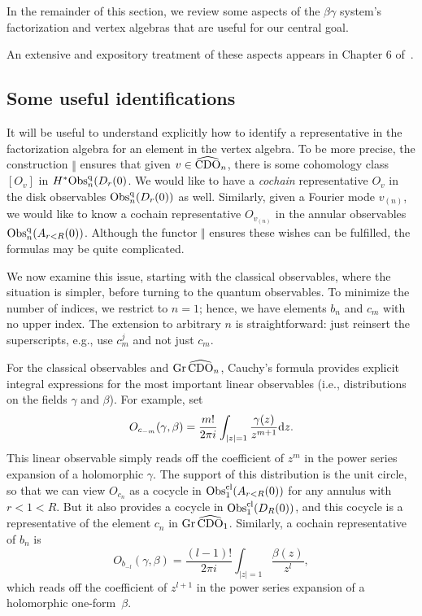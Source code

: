 In the remainder of this section, we review some aspects of the $\beta\gamma$ system's factorization
and vertex algebras that are useful for our central goal.

\begin{rmk}
An extensive and expository treatment of these aspects appears in Chapter 6 of~\cite{GwThesis}.
\end{rmk}

\subsection{Some useful identifications}
\label{identifications}

It will be useful to understand explicitly how to identify a representative in the factorization algebra for an element in the vertex algebra.
To be more precise, the construction $\Vert$ ensures that given $v \in \widehat{\rm CDO}_n$, there is some cohomology class $[O_v]$ in $H^* {\rm Obs}^{\rm q}_n(D_r(0)$.
We would like to have a {\em cochain} representative $O_v$ in the disk observables ${\rm Obs}^{\rm q}_n(D_r(0))$ as well.
Similarly, given a Fourier mode $v_{(n)}$, 
we would like to know a cochain representative $O_{v_{(n)}}$ in the annular observables ${\rm Obs}^{\rm q}_n(A_{r<R}(0))$.
Although the functor $\Vert$ ensures these wishes can be fulfilled,
the formulas may be quite complicated.

We now examine this issue, starting with the classical observables, where the situation is simpler,
before turning to the quantum observables.
To minimize the number of indices, we restrict to $n = 1$; 
hence, we have elements $b_n$ and $c_m$ with no upper index. 
The extension to arbitrary $n$ is straightforward:
just reinsert the superscripts, e.g., use $c^j_m$ and not just $c_m$.

For the classical observables and ${\rm Gr}\, \widehat{\rm CDO}_n$,
Cauchy's formula provides explicit integral expressions for the most important linear observables
(i.e., distributions on the fields $\gamma$ and $\beta$).
For example, set 
\[
O_{c_{-m}}(\gamma,\beta) = \frac{m!}{2 \pi i} \int_{|z| = 1} \frac{\gamma(z)}{z^{m+1}} {\rm d} z.
\]
This linear observable simply reads off the coefficient of $z^m$ in the power series expansion of a holomorphic $\gamma$.
The support of this distribution is the unit circle, 
so that we can view $O_{c_n}$ as a cocycle in ${\rm Obs}^{{\rm cl}}_1(A_{r<R}(0))$ for any annulus with $r < 1 < R$.
But it also provides a cocycle in ${\rm Obs}^{{\rm cl}}_1(D_R(0))$, 
and this cocycle is a representative of the element $c_n$ in ${\rm Gr}\, \widehat{\rm CDO}_1$.
Similarly, a cochain representative of $b_n$ is
\[
O_{b_{-l}}(\gamma,\beta) = \frac{(l-1)!}{2 \pi i} \int_{|z| = 1} \frac{\beta(z)}{z^{l}},
\]
which reads off the coefficient of $z^{l+1}$ in the power series expansion of a holomorphic one-form~$\beta$.

